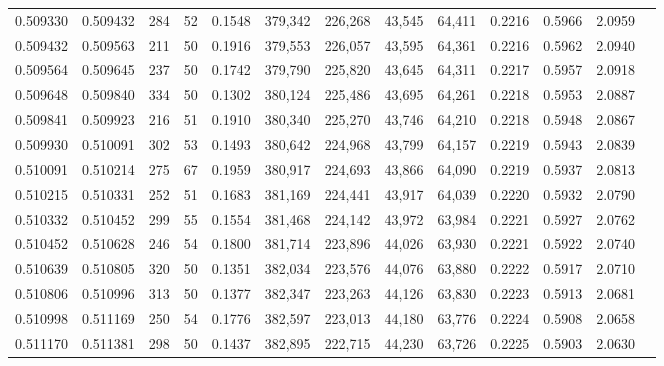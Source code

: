 \begin{tabular}{rrrrrrrrrrrrr}
0.509330 & 0.509432 &   284 &  52 &                                     0.1548 & 379,342 & 226,268 &  43,545 &  64,411 & 0.2216 & 0.5966 & 2.0959 \\
0.509432 & 0.509563 &   211 &  50 &                                     0.1916 & 379,553 & 226,057 &  43,595 &  64,361 & 0.2216 & 0.5962 & 2.0940 \\
0.509564 & 0.509645 &   237 &  50 &                                     0.1742 & 379,790 & 225,820 &  43,645 &  64,311 & 0.2217 & 0.5957 & 2.0918 \\
0.509648 & 0.509840 &   334 &  50 &                                     0.1302 & 380,124 & 225,486 &  43,695 &  64,261 & 0.2218 & 0.5953 & 2.0887 \\
0.509841 & 0.509923 &   216 &  51 &                                     0.1910 & 380,340 & 225,270 &  43,746 &  64,210 & 0.2218 & 0.5948 & 2.0867 \\
0.509930 & 0.510091 &   302 &  53 &                                     0.1493 & 380,642 & 224,968 &  43,799 &  64,157 & 0.2219 & 0.5943 & 2.0839 \\
0.510091 & 0.510214 &   275 &  67 &                                     0.1959 & 380,917 & 224,693 &  43,866 &  64,090 & 0.2219 & 0.5937 & 2.0813 \\
0.510215 & 0.510331 &   252 &  51 &                                     0.1683 & 381,169 & 224,441 &  43,917 &  64,039 & 0.2220 & 0.5932 & 2.0790 \\
0.510332 & 0.510452 &   299 &  55 &                                     0.1554 & 381,468 & 224,142 &  43,972 &  63,984 & 0.2221 & 0.5927 & 2.0762 \\
0.510452 & 0.510628 &   246 &  54 &                                     0.1800 & 381,714 & 223,896 &  44,026 &  63,930 & 0.2221 & 0.5922 & 2.0740 \\
0.510639 & 0.510805 &   320 &  50 &                                     0.1351 & 382,034 & 223,576 &  44,076 &  63,880 & 0.2222 & 0.5917 & 2.0710 \\
0.510806 & 0.510996 &   313 &  50 &                                     0.1377 & 382,347 & 223,263 &  44,126 &  63,830 & 0.2223 & 0.5913 & 2.0681 \\
0.510998 & 0.511169 &   250 &  54 &                                     0.1776 & 382,597 & 223,013 &  44,180 &  63,776 & 0.2224 & 0.5908 & 2.0658 \\
0.511170 & 0.511381 &   298 &  50 &                                     0.1437 & 382,895 & 222,715 &  44,230 &  63,726 & 0.2225 & 0.5903 & 2.0630 \\

\end{tabular}
